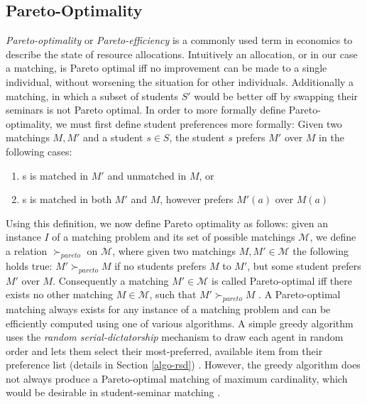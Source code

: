 \subsection{Pareto-Optimality}
\emph{Pareto-optimality} or \emph{Pareto-efficiency} is a commonly used term in economics to describe the state of resource allocations. Intuitively an allocation, or in our case a matching, is Pareto optimal iff no improvement can be made to a single individual, without worsening the situation for other individuals. Additionally a matching, in which a subset of students $S'$ would be better off by swapping their seminars is not Pareto optimal.
In order to more formally define Pareto-optimality, we must first define student preferences more formally: 
Given two matchings $M, M'$ and a student $s \in S$, the student $s$ prefers $M'$ over $M$ in the following cases:
\begin{enumerate}
    \item s is matched in $M'$ and unmatched in $M$, or
    \item s is matched in both $M'$ and $M$, however prefers $M'(a)$ over $M(a)$
\end{enumerate}
Using this definition, we now define Pareto optimality as follows: given an instance $I$ of a matching problem and its set of possible matchings $\mathcal{M}$, we define a relation $\succ_{pareto}$ on $\mathcal{M}$, where given two matchings $M, M' \in \mathcal{M}$ the following holds true: $M' \succ_{pareto} M$ if no students prefers $M$ to $M'$, but some student prefers $M'$ over $M$. Consequently a matching $M' \in \mathcal{M}$ is called Pareto-optimal iff there exists no other matching $M \in \mathcal{M}$, such that $M' \succ_{pareto} M$ \cite{algorithmics}. A Pareto-optimal matching always exists for any instance of a matching problem and can be efficiently computed using one of various algorithms. A simple greedy algorithm uses the \emph{random serial-dictatorship} mechanism to draw each agent in random order and lets them select their most-preferred, available item from their preference list (details in Section \ref{algo-rsd}) \cite{RothTwoSided, SerialDictatorship}. However, the greedy algorithm does not always produce a Pareto-optimal matching of maximum cardinality, which would be desirable in student-seminar matching \cite{Abraham:Pacha}.

